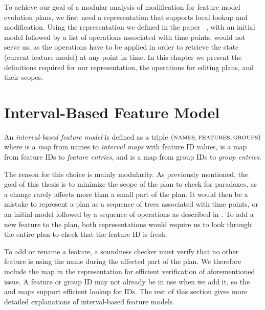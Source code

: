 To achieve our goal of a modular analysis of modification for feature model evolution plans, we first need a representation that supports local lookup and modification. Using the representation we defined in the paper~\cite{art:consistency-preserving-evolution-planning} , with an initial model followed by a list of operations associated with time points, would not serve us, as the operations have to be applied in order to retrieve the state (current feature model) at any point in time. In this chapter we present the definitions required for our representation, the operations for editing plans, and their scopes.

\section{Interval-Based Feature Model}
\label{sec:interval-based-feature-model}

\begin{definition}
  An \emph{interval-based feature model} is defined as a triple $(\textsc{names}, \textsc{features}, \textsc{groups}{})$ where \names{} is a \emph{map} from names to \emph{interval maps} with feature ID values, \features{} is a map from feature IDs to \emph{feature entries}, and \groups{} is a map from group IDs to \emph{group entries}. 
  \label{def:interval-based-feature-model}
\end{definition}

The reason for this choice is mainly modularity. As previously mentioned, the goal of this thesis is to minimize the scope of the plan to check for paradoxes, as a change rarely affects more than a small part of the plan. It would then be a mistake to represent a plan as a sequence of trees associated with time points, or an initial model followed by a sequence of operations as described in  \parencite{art:consistency-preserving-evolution-planning}. To add a new feature to the plan, both representations would require us to look through the entire plan to check that the feature ID is fresh.

To add or rename a feature, a soundness checker must verify that no other feature is using the name during the affected part of the plan. We therefore include the \names{} map in the representation for efficient verification of aforementioned issue. A feature or group ID may not already be in use when we add it, so the \features{} and \groups{} maps support efficient lookup for IDs. The rest of this section gives more detailed explanations of interval-based feature models.

